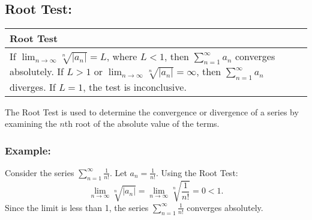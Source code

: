 \documentclass[12pt]{article}
\newcommand{\formula}[2]{
    {\renewcommand{\arraystretch}{2}
        \begin{center}
        \begin{tabular}{|p{0.9\textwidth}|}
        \hline
        \textbf{#1} \\
        \hline
        #2 \\
        \hline
        \end{tabular}
        \end{center}
    }
}
\begin{document}
\vspace{\baselineskip}

\subsection{Root Test: }
\formula{Root Test}{
    If $\lim_{n \to \infty} \sqrt[n]{|a_n|} = L$, where $L < 1$, then $\sum_{n=1}^{\infty} a_n$ converges absolutely. If $L > 1$ or $\lim_{n \to \infty} \sqrt[n]{|a_n|} = \infty$, then $\sum_{n=1}^{\infty} a_n$ diverges. If $L = 1$, the test is inconclusive.
}
The Root Test is used to determine the convergence or divergence of a series by examining the $n$th root of the absolute value of the terms.
\subsubsection{Example: }
Consider the series $\sum_{n=1}^{\infty} \frac{1}{n!}$. Let $a_n = \frac{1}{n!}$. Using the Root Test:
\[
\lim_{n \to \infty} \sqrt[n]{|a_n|} = \lim_{n \to \infty} \sqrt[n]{\frac{1}{n!}} = 0 < 1.
\]
Since the limit is less than 1, the series $\sum_{n=1}^{\infty} \frac{1}{n!}$ converges absolutely.
\end{document}
